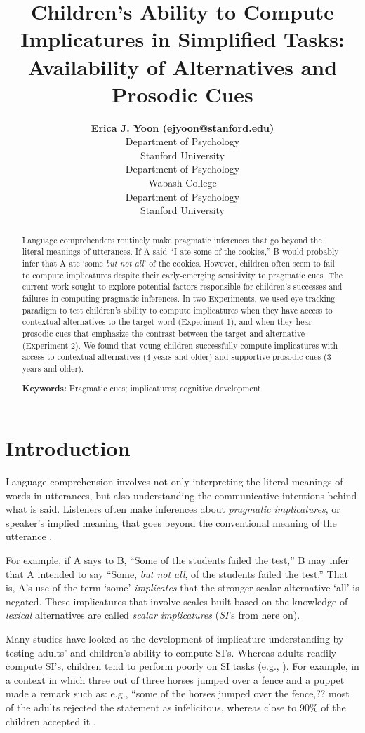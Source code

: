 \documentclass[10pt,letterpaper]{article}
\title{Children's Ability to Compute Implicatures in Simplified Tasks: \linebreak Availability of Alternatives and Prosodic Cues}
\author{{\large \bf Erica J. Yoon (ejyoon@stanford.edu)} \\
  Department of Psychology \\
  Stanford University
  \AND {\large \bf Charles Y. Wu (ywu15@wabash.edu)} \\
  Department of Psychology \\
  Wabash College
  \AND {\large \bf Michael C. Frank (mcfrank@stanford.edu)} \\
  Department of Psychology \\
  Stanford University}
\begin{document}
\maketitle


\begin{abstract}
Language comprehenders routinely make pragmatic inferences that go beyond the literal meanings of utterances. If A said ``I ate some of the cookies,'' B would probably infer that A ate `some \emph{but not all}' of the cookies. However, children often seem to fail to compute implicatures despite their early-emerging sensitivity to pragmatic cues. The current work sought to explore potential factors responsible for children's successes and failures in computing pragmatic inferences. In two Experiments, we used eye-tracking paradigm to test children's ability to compute implicatures when they have access to contextual alternatives to the target word (Experiment 1), and when they hear prosodic cues that emphasize the contrast between the target and alternative (Experiment 2). We found that young children successfully compute implicatures with access to contextual alternatives (4 years and older) and supportive prosodic cues (3 years and older). 

\textbf{Keywords:} 
Pragmatic cues; implicatures; cognitive development

\end{abstract}


\section{Introduction}

Language comprehension involves not only interpreting the literal meanings of words in utterances, but also understanding the communicative intentions behind what is said. Listeners often make inferences about \emph{pragmatic implicatures}, or speaker's implied meaning that goes beyond the conventional meaning of the utterance \cite{grice1975logic}. 

For example, if A says to B, ``Some of the students failed the test,'' B may infer that A intended to say ``Some, \emph{but not all}, of the students failed the test.'' That is, A's use of the term `some' \emph{implicates} that the stronger scalar alternative `all' is negated. These implicatures that involve scales built based on the knowledge of \emph{lexical} alternatives are called \emph{scalar implicatures} (\emph{SI}'s from here on).

Many studies have looked at the development of implicature understanding by testing adults' and children's ability to compute SI's. Whereas adults readily compute SI's, children tend to perform poorly on SI tasks (e.g., ). For example, in a context in which three out of three horses jumped over a fence and a puppet made a remark such as: e.g., ``some of the horses jumped over the fence,?? most of the adults rejected the statement as infelicitous, whereas close to 90\% of the children accepted it \cite{papafragou2003scalar}. %
\end{document}

